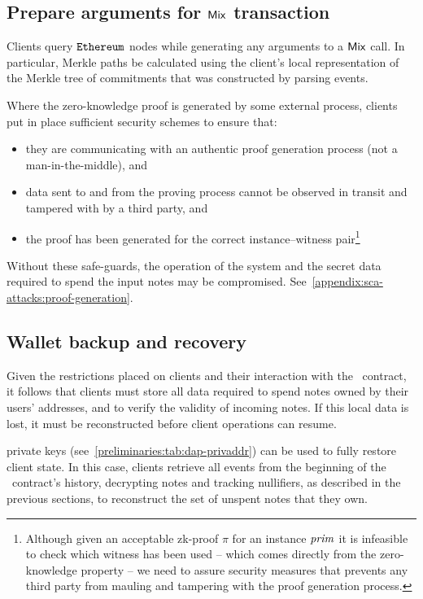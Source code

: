 \subsection{Prepare arguments for $\mathsf{Mix}$ transaction}

Clients \MUSTNOT{} query $\texttt{Ethereum}{}$ nodes while generating any arguments to a $\mathsf{Mix}$ call. In particular, Merkle paths \MUST{} be calculated using the client's local representation of the Merkle tree of commitments that was constructed by parsing events.

Where the zero-knowledge proof is generated by some external process, clients \MUST{} put in place sufficient security schemes to ensure that:
\begin{itemize}
    \item they are communicating with an authentic proof generation process (not a man-in-the-middle), and
    \item data sent to and from the proving process cannot be observed in transit and tampered with by a third party, and
    \item the proof has been generated for the correct instance--witness pair\footnote{Although given an acceptable zk-proof $\pi$ for an instance $\mathit{prim}$ it is infeasible to check which witness has been used -- which comes directly from the zero-knowledge property -- we need to assure security measures that prevents any third party from mauling and tampering with the proof generation process.}
  \end{itemize}

Without these safe-guards, the operation of the system and the secret data required to spend the input notes may be compromised. See~\cref{appendix:sca-attacks:proof-generation}.

\subsection{Wallet backup and recovery}\label{client-security:wallet-backup-and-recovery}

Given the restrictions placed on clients and their interaction with the \mixer~contract, it follows that clients must store all data required to spend notes owned by their users' addresses, and to verify the validity of incoming notes. If this local data is lost, it must be reconstructed before client operations can resume.

\zeth{} private keys (see~\cref{preliminaries:tab:dap-privaddr}) can be used to fully restore client state. In this case, clients \MUST{} retrieve all events from the beginning of the \mixer~contract's history, decrypting notes and tracking nullifiers, as described in the previous sections, to reconstruct the set of unspent notes that they own.

